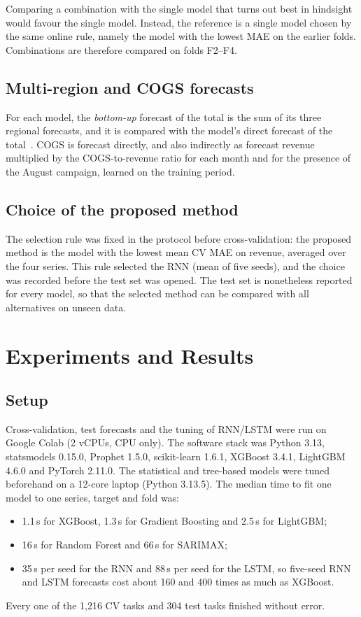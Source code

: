 \documentclass[conference]{IEEEtran}
\begin{document}
Comparing a combination with the single model that turns out best in hindsight would favour the single model.
Instead, the reference is a single model chosen by the same online rule, namely the model with the lowest MAE on the earlier folds.
Combinations are therefore compared on folds F2--F4.

\subsection{Multi-region and COGS forecasts}
For each model, the \emph{bottom-up} forecast of the total is the sum of its three regional forecasts, and it is compared with the model's direct forecast of the total~\cite{hyndman2011hierarchical}.
COGS is forecast directly, and also indirectly as forecast revenue multiplied by the COGS-to-revenue ratio for each month and for the presence of the August campaign, learned on the training period.

\subsection{Choice of the proposed method}
The selection rule was fixed in the protocol before cross-validation: the proposed method is the model with the lowest mean CV MAE on revenue, averaged over the four series.
This rule selected the RNN (mean of five seeds), and the choice was recorded before the test set was opened.
The test set is nonetheless reported for every model, so that the selected method can be compared with all alternatives on unseen data.

\section{Experiments and Results}
\subsection{Setup}
Cross-validation, test forecasts and the tuning of RNN/LSTM were run on Google Colab (2 vCPUs, CPU only).
The software stack was Python 3.13, statsmodels 0.15.0, Prophet 1.5.0, scikit-learn 1.6.1, XGBoost 3.4.1, LightGBM 4.6.0 and PyTorch 2.11.0.
The statistical and tree-based models were tuned beforehand on a 12-core laptop (Python 3.13.5).
The median time to fit one model to one series, target and fold was:
\begin{itemize}
\item 1.1\,s for XGBoost, 1.3\,s for Gradient Boosting and 2.5\,s for LightGBM;
\item 16\,s for Random Forest and 66\,s for SARIMAX;
\item 35\,s per seed for the RNN and 88\,s per seed for the LSTM, so five-seed RNN and LSTM forecasts cost about 160 and 400 times as much as XGBoost.
\end{itemize}
Every one of the 1{,}216 CV tasks and 304 test tasks finished without error.
\end{document}
